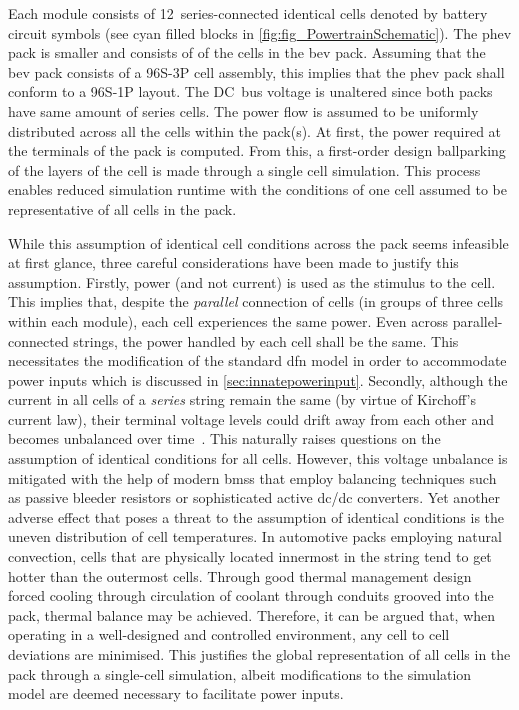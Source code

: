 Each module consists  of 12~series-connected identical cells  denoted by battery
circuit symbols (see cyan  filled blocks in \cref{fig:fig_PowertrainSchematic}).
The \gls{phev}  pack is smaller and  consists of  of  the cells in
the \gls{bev} pack. Assuming that the \gls{bev} pack consists of a \mbox{96S-3P}
cell  assembly,  this implies  that  the  \gls{phev}  pack  shall conform  to  a
\mbox{96S-1P} layout. The DC~bus voltage is unaltered since both packs have same
amount of  series cells. The power  flow is assumed to  be uniformly distributed
across all  the cells within  the pack(s). At first,  the power required  at the
terminals of the  pack is computed. From this, a  first-order design ballparking
of the layers of the cell is made through a single cell simulation. This process
enables reduced simulation runtime with the conditions of one cell assumed to be
representative of all cells in the pack.



While  this  assumption of  identical  cell  conditions  across the  pack  seems
infeasible  at first  glance, three  careful  considerations have  been made  to
justify  this assumption.  Firstly,  power  (and not  current)  is  used as  the
stimulus to the cell. This  implies that, despite the \emph{parallel} connection
of cells  (in groups of three  cells within each module),  each cell experiences
the same  power. Even  across parallel-connected strings,  the power  handled by
each cell shall be the same.  This necessitates the modification of the standard
\gls{dfn}  model in  order to  accommodate power  inputs which  is discussed  in
\cref{sec:innatepowerinput}. Secondly,  although the current  in all cells  of a
\emph{series}  string remain  the same  (by virtue  of Kirchoff's  current law),
their  terminal voltage  levels could  drift away  from each  other and  becomes
unbalanced over  time~\cite{Andrea2010}. This naturally raises  questions on the
assumption  of  identical  conditions  for  all  cells.  However,  this  voltage
unbalance is mitigated with the help of modern \glspl{bms} that employ balancing
techniques  such as  passive  bleeder resistors  or  sophisticated active  dc/dc
converters.
Yet another  adverse effect that poses  a threat to the  assumption of identical
conditions is the uneven distribution  of cell temperatures. In automotive packs
employing natural convection, cells that are physically located innermost in the
string  tend to  get  hotter  than the  outermost  cells.  Through good  thermal
management design  \eg{} forced cooling  through circulation of  coolant through
conduits  grooved into  the pack,  thermal balance  may be  achieved. Therefore,
it  can  be argued  that,  when  operating  in  a well-designed  and  controlled
environment,  any cell  to cell  deviations  are minimised.  This justifies  the
global representation of all cells in the pack through a single-cell simulation,
albeit modifications to the simulation  model are deemed necessary to facilitate
power inputs.

